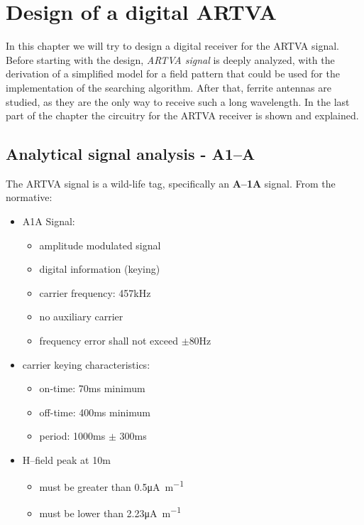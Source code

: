 
\chapter{Design of a digital ARTVA \label{ch:chapter2}}
\minitoc
\renewcommand{\arraystretch}{2}

In this chapter we will try to design a digital receiver for the ARTVA signal. Before starting with the design, \emph{ARTVA signal} is deeply analyzed, with the derivation of a simplified model for a field pattern that could be used  for the implementation of the searching algorithm. After that, ferrite antennas are studied, as they are the only way to receive such a long wavelength. In the last part of the chapter the circuitry for the ARTVA receiver is shown and explained.



\section{Analytical signal analysis - A1--A \label{sec:a1asegnale}}

The ARTVA signal is a wild-life tag, specifically an \textbf{A--1A} signal. From the normative\cite{NormativaARVA}:
\begin{itemize}
\item A1A Signal:
	\begin{itemize}
	\item amplitude modulated signal
	\item digital information (keying)
	\item carrier frequency: \num{457}\si{\kilo\hertz}
	\item no auxiliary carrier
	\item frequency error shall not exceed $\pm$\num{80}\si{\hertz}
	\end{itemize}
\item carrier keying characteristics:
	\begin{itemize}
	\item on-time: \num{70}\si{\milli\second} minimum
	\item off-time: \num{400}\si{\milli\second} minimum
	\item period: \num{1000}\si{\milli\second} $\pm$ \num{300}\si{\milli\second}
	\end{itemize}
\item H--field peak at \num{10}\si{\meter}
	\begin{itemize}
	\item must be greater than \num{0.5}\si{\micro\ampere\per\meter}
	\item must be lower than \num{2.23}\si{\micro\ampere\per\meter}
	\end{itemize}
\end{itemize}


